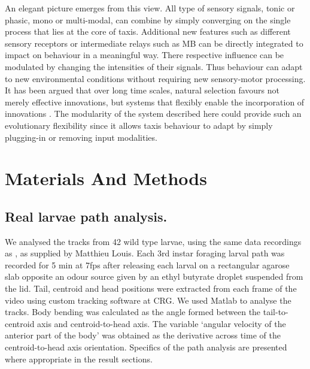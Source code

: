 \documentclass[11pt,a4paper]{article}
\begin{document}
An elegant picture emerges from this view. All type of sensory signals, tonic or phasic, mono or multi-modal, can combine by simply converging on the single process that lies at the core of taxis. Additional new features such as different sensory receptors or intermediate relays such as MB can be directly integrated to impact on behaviour in a meaningful way. There respective influence can be modulated by changing the intensities of their signals. Thus behaviour can adapt to new environmental conditions  without requiring new sensory-motor processing. It has been argued that over long time scales, natural selection favours not merely effective innovations, but systems that flexibly enable the incorporation of innovations \citep{vermeij1973adaptation}. The modularity of the system described here could provide such an evolutionary flexibility since it allows taxis behaviour to adapt by simply plugging-in or removing input modalities.


\section{Materials And Methods}
\subsection{Real larvae path analysis.}
We analysed the tracks from 42 wild type larvae, using the same data recordings as \cite{gomez2011active}, as supplied by Matthieu Louis. Each 3rd instar foraging larval path was recorded for 5 min at 7fps after releasing each larval on a rectangular agarose slab opposite an odour source given by an ethyl butyrate droplet suspended from the lid. Tail, centroid and head positions were extracted from each frame of the video using custom tracking software at CRG. We used Matlab to analyse the tracks. Body bending was calculated as the angle formed between the tail-to-centroid axis and centroid-to-head axis. The variable ‘angular velocity of the anterior part of the body’ was obtained as the derivative across time of the centroid-to-head axis orientation. Specifics of the path analysis are presented where appropriate in the result sections. 
\end{document}
